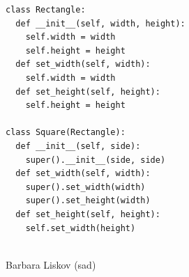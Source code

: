 \documentclass[calcdimensions,landscape,letterpaper]{powersem}
\newcommand{\thecurrentheading}{}
\newcommand{\heading}[1]{\renewcommand{\thecurrentheading}{#1}}
\begin{document}
\begin{slide}
  \heading{Liskov-Substitution - Before}
  \begin{center}
    \begin{minipage}[c]{.6\textwidth}
      \begin{verbatim}
class Rectangle:
  def __init__(self, width, height):
    self.width = width
    self.height = height
  def set_width(self, width):
    self.width = width
  def set_height(self, height):
    self.height = height

class Square(Rectangle):
  def __init__(self, side):
    super().__init__(side, side)
  def set_width(self, width):
    super().set_width(width)
    super().set_height(width)
  def set_height(self, height):
    self.set_width(height)
      \end{verbatim}
    \end{minipage}
    \begin{minipage}[c]{.35\textwidth}
      \begin{center}
        \\
        Barbara Liskov (sad)
      \end{center}
    \end{minipage}
  \end{center}
\end{slide}
\end{document}

